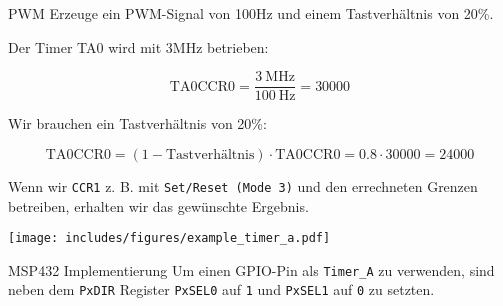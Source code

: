 \begin{example}{PWM}
    Erzeuge ein PWM-Signal von 100Hz und einem Tastverhältnis von 20\%.

    Der Timer TA0 wird mit 3MHz betrieben:

    \[
        \text{TA0CCR0} = \frac{\SI{3}{\mega\hertz}}{\SI{100}{\hertz}} = \num{30000}
    \]

    Wir brauchen ein Tastverhältnis von 20\%:

    \[
        \text{TA0CCR0} = (1 - \text{Tastverhältnis}) \cdot \text{TA0CCR0} = 0.8 \cdot \num{30000} = \num{24000}
    \]

    Wenn wir \texttt{CCR1} z. B. mit \texttt{Set/Reset (Mode 3)} und den errechneten Grenzen betreiben, erhalten wir das gewünschte Ergebnis.

    \begin{center}
        \texttt{[image: includes/figures/example\_timer\_a.pdf]}
    \end{center}
\end{example}

\begin{bonus}{MSP432 Implementierung}
    Um einen GPIO-Pin als \texttt{Timer\_A} zu verwenden, sind neben dem \texttt{PxDIR} Register \texttt{PxSEL0} auf \texttt{1} und \texttt{PxSEL1} auf \texttt{0} zu setzten.
\end{bonus}